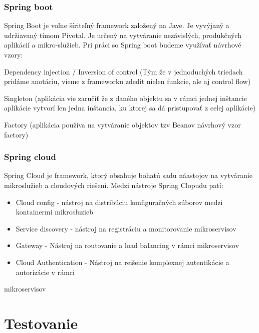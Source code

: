 

\subsubsection{Spring boot}
\noindent Spring Boot je voľne šíriteľný framework založený na Jave. Je vyvýjaný a udržiavaný tímom Pivotal. Je určený na vytváranie nezávislých, produkčných aplikácií a mikro-služieb. 
Pri práci so Spring boot budeme využívať návrhové vzory:

Dependency injection / Inversion of control (Tým že v jednoduchých triedach pridáme anotáciu, vieme z frameworku zdedit nielen funkcie, ale aj control flow) 

Singleton (aplikácia vie zaručiť že z daného objektu sa v rámci jednej inštancie aplikácie vytvorí len jedna inštancia, ku ktorej sa dá pristupovať z celej aplikácie)

Factory (aplikácia používa na vytváranie objektov tzv Beanov návrhový vzor factory)



\subsubsection{Spring cloud}
\noindent Spring Cloud je framework, ktorý obsahuje bohatú sadu náastojov na vytváranie mikroslužieb a cloudových riešení. Medzi nástroje Spring Clopudu patí: 
\begin{itemize}
\item Cloud config - nástroj na distribúciu konfiguračných súborov medzi kontainermi mikrosluzieb
\item Service discovery - nástroj na registráciu a monitorovanie mikroservisov
\item Gateway - Nástroj na routovanie a load balancing v rámci mikroservisov
\item Cloud Authentication - Nástroj na reišenie komplexnej autentikácie a autorízácie v rámci
\end{itemize}
 mikroservisov





\section{Testovanie}




\section{}

